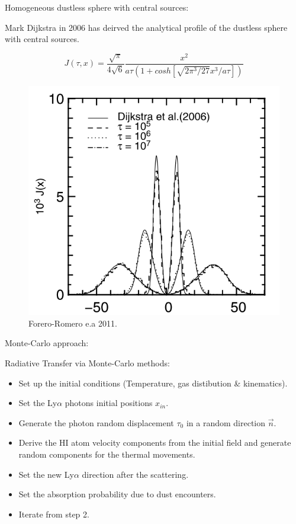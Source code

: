 \documentclass{beamer}
\begin{document}
\begin{frame}{Homogeneous dustless sphere with central sources:}

Mark Dijkstra in 2006 has deirved the analytical profile of the dustless sphere with 
central sources. 

\begin{equation}
J(\tau, x) = \dfrac{\sqrt{\pi}}{4 \sqrt{6}} \dfrac{x^2}{a \tau (1 + cosh[\sqrt{2\pi^3/27}x^3 / a\tau])}
\end{equation}

\begin{figure}
\includegraphics[scale=0.2]{Figures/sphere.png}
\caption*{Forero-Romero e.a 2011.}
\end{figure}
\end{frame}

\begin{frame}
\LARGE{Monte-Carlo approach:}
\end{frame}

\begin{frame}{Radiative Transfer via Monte-Carlo methods:}
\begin{itemize}
\item Set up the initial conditions (Temperature, gas distibution \& kinematics).
\item Set the Ly$\alpha$ photons initial positions $x_{in}$.
\item Generate the photon random displacement $\tau_0$ in a random direction
$\vec{n}$.
\item Derive the HI atom velocity components from the initial field and
generate random components for the thermal movements.
\item Set the new Ly$\alpha$ direction after the scattering.
\item Set the absorption probability due to dust encounters.
\item Iterate from step 2.
\end{itemize}
\end{frame}
\end{document}
